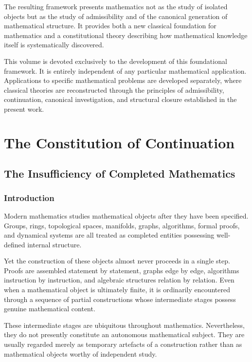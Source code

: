 \documentclass[13pt,openany]{book}
\theoremstyle{plain}
\theoremstyle{definition}
\begin{document}
The resulting framework presents mathematics not as the study of isolated
objects but as the study of admissibility and of the canonical generation of
mathematical structure. It provides both a new classical foundation for
mathematics and a constitutional theory describing how mathematical knowledge
itself is systematically discovered.

This volume is devoted exclusively to the development of this foundational
framework. It is entirely independent of any particular mathematical
application. Applications to specific mathematical problems are developed
separately, where classical theories are reconstructed through the principles
of admissibility, continuation, canonical investigation, and structural
closure established in the present work.

\mainmatter

\part{The Constitution of Continuation}

\chapter{The Insufficiency of Completed Mathematics}

\section{Introduction}

Modern mathematics studies mathematical objects after they have been specified.
Groups, rings, topological spaces, manifolds, graphs, algorithms, formal proofs,
and dynamical systems are all treated as completed entities possessing
well-defined internal structure.

Yet the construction of these objects almost never proceeds in a single step.
Proofs are assembled statement by statement, graphs edge by edge,
algorithms instruction by instruction, and algebraic structures relation by
relation. Even when a mathematical object is ultimately finite, it is ordinarily
encountered through a sequence of partial constructions whose intermediate
stages possess genuine mathematical content.

These intermediate stages are ubiquitous throughout mathematics.
Nevertheless, they do not presently constitute an autonomous mathematical
subject. They are usually regarded merely as temporary artefacts of a
construction rather than as mathematical objects worthy of independent study.
\end{document}
